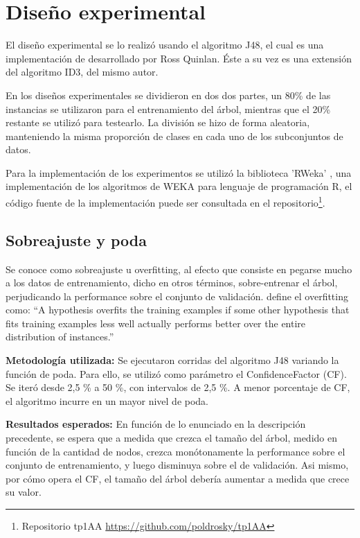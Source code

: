 \section{Diseño experimental}

El diseño experimental se lo realizó usando el algoritmo J48, el cual es una implementación de \cite{hall2009weka}
desarrollado por Ross Quinlan. Éste a su vez es una extensión del algoritmo ID3, del mismo autor.

En los diseños experimentales se dividieron en dos dos partes, un 80\% de las instancias
se utilizaron para el entrenamiento del árbol, mientras que el 20\% restante se utilizó para
testearlo. La división se hizo de forma aleatoria, manteniendo la misma proporción de clases en cada
uno de los subconjuntos de datos.

Para la implementación de los experimentos se utilizó la biblioteca 'RWeka' \cite{rweka}, una implementación de los algoritmos de 
WEKA para lenguaje de programación R, el código fuente de la implementación puede ser consultada en el repositorio\footnote{
Repositorio tp1AA \url{https://github.com/poldrosky/tp1AA}}.

\subsection{Sobreajuste y poda}

Se conoce como sobreajuste u overfitting, al efecto que consiste en pegarse mucho a los 
datos de entrenamiento, dicho en otros términos, sobre-entrenar el árbol,
perjudicando la performance sobre el conjunto de validación. \cite{mitchell1997machine}
define el overfitting como: ``A hypothesis overfits the training examples if some other hypothesis that
fits training examples less well actually performs better over the entire distribution of instances.''

\textbf{Metodología utilizada:} Se ejecutaron corridas del algoritmo J48 variando la función de
poda. Para ello, se utilizó como parámetro el ConfidenceFactor (CF). Se iteró desde 2,5 \%
a 50 \%, con intervalos de 2,5 \%. A menor porcentaje de CF, el algoritmo incurre en un mayor nivel
de poda. 

\textbf{Resultados esperados:} En función de lo enunciado en la descripción precedente, se
espera que a medida que crezca el tamaño del árbol, medido en función de la cantidad de
nodos, crezca monótonamente la performance sobre el conjunto de entrenamiento, y
luego disminuya sobre el de validación. Asi mismo, por cómo opera el CF, el tamaño del
árbol debería aumentar a medida que crece su valor.

